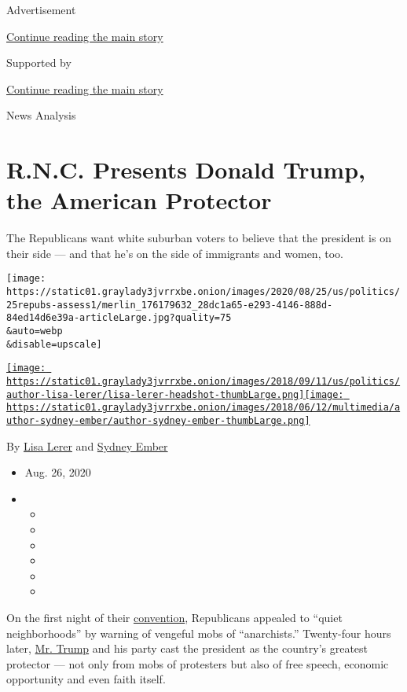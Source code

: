 Advertisement

\protect\hyperlink{after-top}{Continue reading the main story}

Supported by

\protect\hyperlink{after-sponsor}{Continue reading the main story}

News Analysis

\hypertarget{rnc-presents-donald-trump-the-american-protector}{%
\section{R.N.C. Presents Donald Trump, the American
Protector}\label{rnc-presents-donald-trump-the-american-protector}}

The Republicans want white suburban voters to believe that the president
is on their side --- and that he's on the side of immigrants and women,
too.

\texttt{[image: https://static01.graylady3jvrrxbe.onion/images/2020/08/25/us/politics/25repubs-assess1/merlin\_176179632\_28dc1a65-e293-4146-888d-84ed14d6e39a-articleLarge.jpg?quality=75\\\&auto=webp\\\&disable=upscale]}

\href{https://www.nytimes3xbfgragh.onion/by/lisa-lerer}{\texttt{[image: https://static01.graylady3jvrrxbe.onion/images/2018/09/11/us/politics/author-lisa-lerer/lisa-lerer-headshot-thumbLarge.png]}}\href{https://www.nytimes3xbfgragh.onion/by/sydney-ember}{\texttt{[image: https://static01.graylady3jvrrxbe.onion/images/2018/06/12/multimedia/author-sydney-ember/author-sydney-ember-thumbLarge.png]}}

By \href{https://www.nytimes3xbfgragh.onion/by/lisa-lerer}{Lisa Lerer}
and \href{https://www.nytimes3xbfgragh.onion/by/sydney-ember}{Sydney
Ember}

\begin{itemize}
\item
  Aug. 26, 2020
\item
  \begin{itemize}
  \item
  \item
  \item
  \item
  \item
  \item
  \end{itemize}
\end{itemize}

On the first night of their
\href{https://www.nytimes3xbfgragh.onion/2020/08/26/us/politics/republican-convention-recap.html}{convention},
Republicans appealed to ``quiet neighborhoods'' by warning of vengeful
mobs of ``anarchists.'' Twenty-four hours later,
\href{https://www.nytimes3xbfgragh.onion/2020/08/26/us/politics/rnc-trump-character.html}{Mr.
Trump} and his party cast the president as the country's greatest
protector --- not only from mobs of protesters but also of free speech,
economic opportunity and even faith itself.

